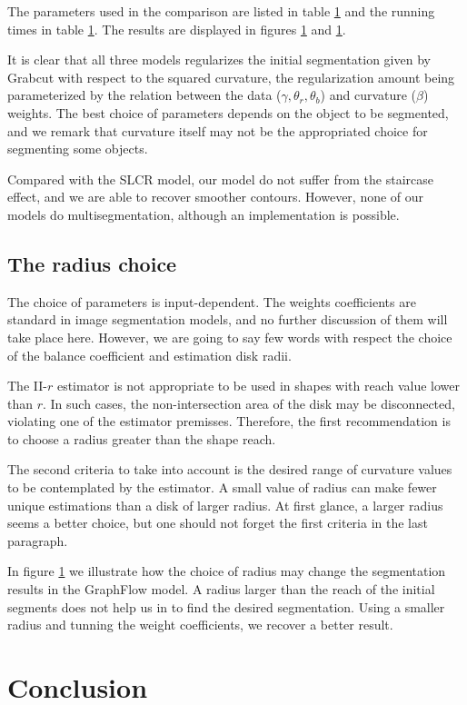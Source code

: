 The parameters used in the comparison are listed in table \ref{} and the running times in table \ref{}. The results are displayed in figures \ref{} and \ref{}.

It is clear that all three models regularizes the initial segmentation given by Grabcut with respect to the squared curvature, the regularization amount being parameterized by the relation between the data ($\gamma, \theta_r, \theta_b$) and curvature ($\beta$) weights. The best choice of parameters depends on the object to be segmented, and we remark that curvature itself may not be the appropriated choice for segmenting some objects.

Compared with the SLCR model, our model do not suffer from the staircase effect, and we are able to recover smoother contours. However, none of our models do multisegmentation, although an implementation is possible.

\subsection{The radius choice}

The choice of parameters is input-dependent. The weights coefficients are standard in image segmentation models, and no further discussion of them will take place here. However, we are going to say few words with respect the choice of the balance coefficient and estimation disk radii.

The II-$r$ estimator is not appropriate to be used in shapes with reach value lower than $r$. In such cases, the non-intersection area of the disk may be disconnected, violating one of the estimator premisses. Therefore, the first recommendation is to choose a radius greater than the shape reach.

The second criteria to take into account is the desired range of curvature values to be contemplated by the estimator. A small value of radius can make fewer unique estimations than a disk of larger radius. At first glance, a larger radius seems a better choice, but one should not forget the first criteria in the last paragraph.

In figure \ref{} we illustrate how the choice of radius may change the segmentation results in the GraphFlow model. A radius larger than the reach of the initial segments does not help us in to find the desired segmentation. Using a smaller radius and tunning the weight coefficients, we recover a better result.

\section{Conclusion}




